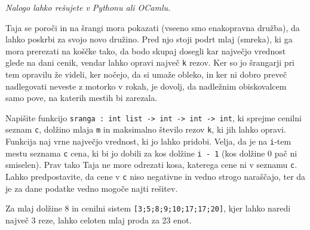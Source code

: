 \documentclass[arhiv]{../izpit}
\begin{document}
\naloga

\emph{Nalogo lahko rešujete v Pythonu ali OCamlu.}

Taja se poroči in na šrangi mora pokazati (vseeno smo enakopravna družba), da lahko poskrbi za svojo novo družino.
Pred njo stoji podrt mlaj (smreka), ki ga mora prerezati na koščke tako, da bodo skupaj dosegli kar največjo vrednost glede na dani cenik, vendar lahko opravi največ \verb|k| rezov.
Ker so jo šrangarji pri tem opravilu že videli, ker nočejo, da si umaže obleko, in ker ni dobro preveč nadlegovati neveste z motorko v rokah, je dovolj, da nadležnim obiskovalcem samo pove, na katerih mestih bi zarezala.

Napišite funkcijo \verb|sranga : int list -> int -> int -> int|, ki sprejme cenilni seznam \verb|c|, dolžino mlaja \verb|m| in maksimalno število rezov \verb|k|, ki jih lahko opravi.
Funkcija naj vrne največjo vrednost, ki jo lahko pridobi.
Velja, da je na \verb|i|-tem mestu seznama \verb|c| cena, ki bi jo dobili za kos dolžine \verb|i - 1| (kos dolžine 0 pač ni smiselen). Prav tako Taja ne more odrezati kosa, katerega cene ni v seznamu \verb|c|.
Lahko predpostavite, da cene v \verb|c| niso negativne in vedno strogo naraščajo, ter da je za dane podatke vedno mogoče najti rešitev.

Za mlaj dolžine 8 in cenilni sistem \verb|[3;5;8;9;10;17;17;20]|, kjer lahko naredi največ 3 reze, lahko celoten mlaj proda za 23 enot.
\end{document}
